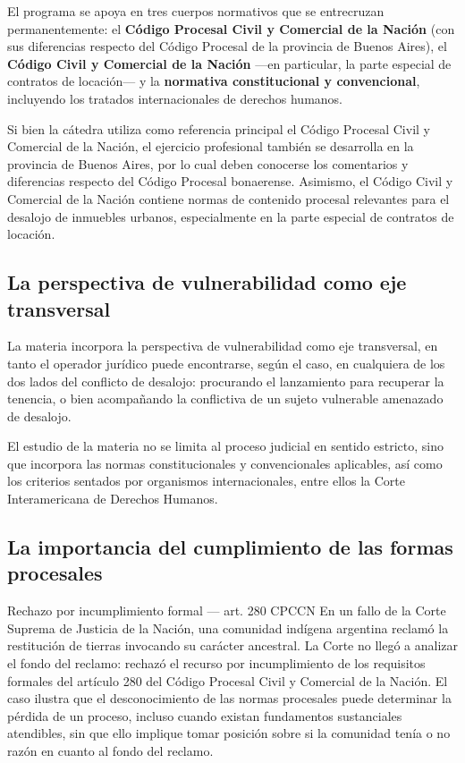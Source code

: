 \documentclass[12pt,oneside]{book}
\begin{document}
\begin{important}
El programa se apoya en tres cuerpos normativos que se entrecruzan permanentemente: el \textbf{Código Procesal Civil y Comercial de la Nación} (con sus diferencias respecto del Código Procesal de la provincia de Buenos Aires), el \textbf{Código Civil y Comercial de la Nación} ---en particular, la parte especial de contratos de locación--- y la \textbf{normativa constitucional y convencional}, incluyendo los tratados internacionales de derechos humanos.
\end{important}

Si bien la cátedra utiliza como referencia principal el Código Procesal Civil y Comercial de la Nación, el ejercicio profesional también se desarrolla en la provincia de Buenos Aires, por lo cual deben conocerse los comentarios y diferencias respecto del Código Procesal bonaerense. Asimismo, el Código Civil y Comercial de la Nación contiene normas de contenido procesal relevantes para el desalojo de inmuebles urbanos, especialmente en la parte especial de contratos de locación.

\subsection{La perspectiva de vulnerabilidad como eje transversal}

La materia incorpora la perspectiva de vulnerabilidad como eje transversal, en tanto el operador jurídico puede encontrarse, según el caso, en cualquiera de los dos lados del conflicto de desalojo: procurando el lanzamiento para recuperar la tenencia, o bien acompañando la conflictiva de un sujeto vulnerable amenazado de desalojo.

\begin{note}
El estudio de la materia no se limita al proceso judicial en sentido estricto, sino que incorpora las normas constitucionales y convencionales aplicables, así como los criterios sentados por organismos internacionales, entre ellos la Corte Interamericana de Derechos Humanos.
\end{note}

\subsection{La importancia del cumplimiento de las formas procesales}

\begin{example}{Rechazo por incumplimiento formal --- art. 280 CPCCN}
En un fallo de la Corte Suprema de Justicia de la Nación, una comunidad indígena argentina reclamó la restitución de tierras invocando su carácter ancestral. La Corte no llegó a analizar el fondo del reclamo: rechazó el recurso por incumplimiento de los requisitos formales del artículo 280 del Código Procesal Civil y Comercial de la Nación. El caso ilustra que el desconocimiento de las normas procesales puede determinar la pérdida de un proceso, incluso cuando existan fundamentos sustanciales atendibles, sin que ello implique tomar posición sobre si la comunidad tenía o no razón en cuanto al fondo del reclamo.
\end{example}
\end{document}

